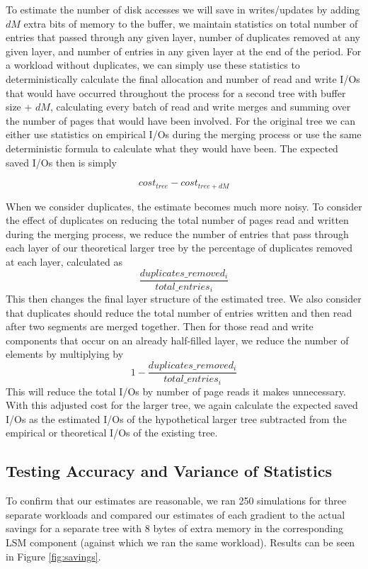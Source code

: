 \documentclass{sig-alternate-05-2015}
\begin{document}
To estimate the number of disk accesses we will save in writes/updates by adding $dM$ extra bits of memory to the buffer, 
we maintain statistics on total number of entries that passed through any given layer, number of duplicates removed at any given layer, and number of entries in any given layer at the end of the period. For a workload without duplicates, we can simply
use these statistics to deterministically calculate the final allocation and number of read and write I/Os that would have
occurred throughout the process for a second tree with buffer size + $dM$, calculating every batch of read and write merges and summing over the number of pages that would have been involved. For the original tree we can either use statistics on empirical I/Os during the merging process or use the same deterministic formula to calculate what they would have been. The expected saved I/Os then is simply

$$cost_{tree} - cost_{tree+dM}$$

When we consider duplicates, the estimate becomes much more noisy. To consider the effect of duplicates on reducing the total number of pages read and written during the merging process, we reduce the number of entries that pass through each layer of our theoretical larger tree by the percentage of duplicates removed at each layer, calculated as $$\frac{duplicates\_removed_{i}}{total\_entries_{i}}$$
This then changes the final layer structure of the estimated tree. We also consider that duplicates should reduce the total number of entries written and then read after two segments are merged together. Then for those read and write components that occur on an already half-filled layer, we reduce the number of elements by multiplying by $$1 - \frac{duplicates\_removed_{i}}{total\_entries_{i}}$$
This will reduce the total I/Os by number of page reads it makes unnecessary. With this adjusted cost for the larger tree, we again calculate the expected saved I/Os as the estimated I/Os of the hypothetical larger tree subtracted from the empirical or theoretical I/Os of the existing tree.

\subsection{Testing Accuracy and Variance of Statistics}

To confirm that our estimates are reasonable, we ran 250 simulations for three
separate workloads and compared our estimates of each gradient to the actual
savings for a separate tree with 8 bytes of extra memory in the corresponding
LSM component (against which we ran the same workload). Results can be seen in
Figure \ref{fig:savings}.
\end{document}
